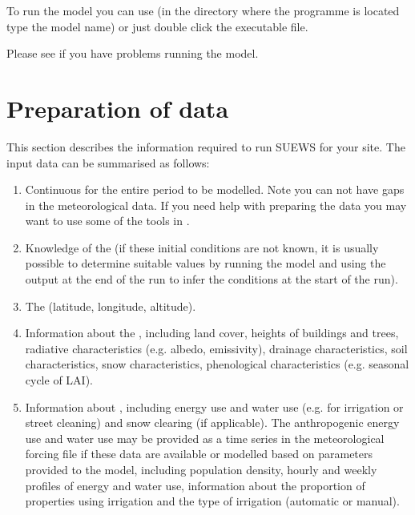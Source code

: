 \documentclass[letterpaper,10pt,english]{sphinxmanual}
\begin{document}
To run the model you can use  (in the directory where
the programme is located type the model name) or just double click the
executable file.

Please see {\hyperref[\detokenize{troubleshooting:troubleshooting}]{}} if you have problems
running the model.


\section{Preparation of data}
\label{\detokenize{prepare-to-run-the-model:preparation-of-data}}
This section describes the information required to run SUEWS for your
site. The input data can be summarised as follows:
\begin{enumerate}
\item {} 
Continuous  for the entire period to be
modelled. Note you can not have gaps in the meteorological data. If
you need help with preparing the data you may want to use some of the
tools in
.

\item {} 
Knowledge of the  (if these initial conditions are not known, it is
usually possible to determine suitable values by running the model
and using the output at the end of the run to infer the conditions at
the start of the run).

\item {} 
The  (latitude, longitude, altitude).

\item {} 
Information about the , including
land cover, heights of buildings and trees, radiative characteristics
(e.g. albedo, emissivity), drainage characteristics, soil
characteristics, snow characteristics, phenological characteristics
(e.g. seasonal cycle of LAI).

\item {} 
Information about , including energy use and water
use (e.g. for irrigation or street cleaning) and snow clearing (if
applicable). The anthropogenic energy use and water use may be
provided as a time series in the meteorological forcing file if these
data are available or modelled based on parameters provided to the
model, including population density, hourly and weekly profiles of
energy and water use, information about the proportion of properties
using irrigation and the type of irrigation (automatic or manual).

\end{enumerate}
\end{document}
